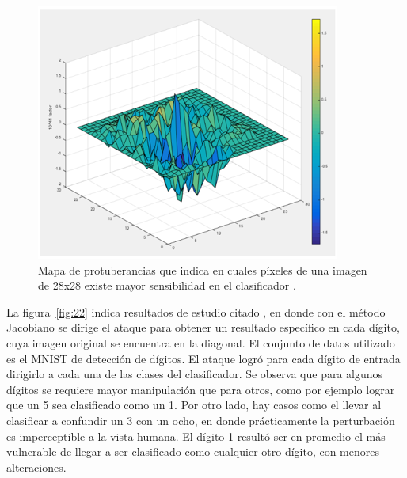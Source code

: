 \begin{figure}[th]
\centering
\includegraphics [scale = 1] {Figures/figura_21.PNG}
\decoRule
\caption[Mapa]{Mapa de protuberancias que indica en cuales píxeles de una imagen de 28x28 existe mayor sensibilidad en el clasificador \parencite{r13}.}
\label{fig:21}
\end{figure}

La figura~\ref{fig:22} indica resultados de estudio citado \parencite{r13}, en donde con el método Jacobiano se dirige el ataque para obtener un resultado específico en cada dígito, cuya imagen original se encuentra en la diagonal. El conjunto de datos utilizado es el MNIST de detección de dígitos. El ataque logró para cada dígito de entrada dirigirlo a cada una de las clases del clasificador. Se observa que para algunos dígitos se requiere mayor manipulación que para otros, como por ejemplo lograr que un 5 sea clasificado como un 1. Por otro lado, hay casos como el llevar al clasificar a confundir un 3 con un ocho, en donde prácticamente la perturbación es imperceptible a la vista humana. El dígito 1 resultó ser en promedio el más vulnerable de llegar a ser clasificado como cualquier otro dígito, con menores alteraciones.

